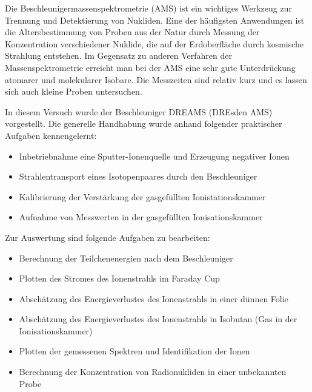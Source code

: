 Die Beschleunigermas­senspektrometrie (AMS) ist ein wichtiges Werkzeug zur Trennung und Detektierung von Nukliden.
Eine der häufigsten Anwendungen ist die Altersbestimmung von Proben aus der Natur durch Messung der Konzentration verschiedener Nuklide, die auf der Erdoberfläche durch kosmische Strahlung entstehen.
Im Gegensatz zu anderen Verfahren der Massenspektrometrie erreicht man bei der AMS eine sehr gute Unterdrückung atomarer und molekularer Isobare.
Die Messzeiten sind relativ kurz und es lassen sich auch kleine Proben untersuchen.

In diesem Versuch wurde der Beschleuniger DREAMS (DREsden AMS) vorgestellt.
Die generelle Handhabung wurde anhand folgender praktischer Aufgaben kennengelernt:
\begin{itemize}
  \item Inbetriebnahme eine Sputter-Ionenquelle und Erzeugung negativer Ionen
  \item Strahlentransport eines Isotopenpaares durch den Beschleuniger
  \item Kalibrierung der Verstärkung der gasgefüllten Ionistationskammer
  \item Aufnahme von Messwerten in der gasgefüllten Ionisationskammer
\end{itemize}

Zur Auswertung sind folgende Aufgaben zu bearbeiten:
\begin{itemize}
  \item Berechnung der Teilchenenergien nach dem Beschleuniger
  \item Plotten des Stromes des Ionenstrahls im Faraday Cup
  \item Abschätzung des Energieverlustes des Ionenstrahls in einer dünnen Folie
  \item Abschätzung des Energieverlustes des Ionenstrahls in Isobutan (Gas in der Ionisationskammer)
  \item Plotten der gemessenen Spektren und Identifikation der Ionen
  \item Berechnung der Konzentration von Radionukliden in einer unbekannten Probe
\end{itemize}
